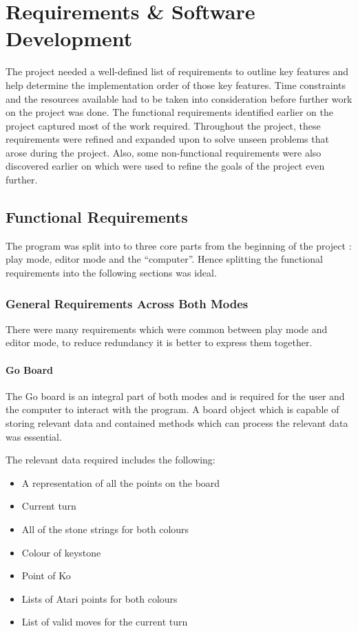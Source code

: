 \documentclass{l4proj}
\begin{document}
\chapter{Requirements \& Software Development}

The project needed a well-defined list of requirements to outline key features and help determine the implementation order of those key features. Time constraints and the resources available had to be taken into consideration before further work on the project was done. The functional requirements identified earlier on the project captured most of the work required. Throughout the project, these requirements were refined and expanded upon to solve unseen problems that arose during the project. Also, some non-functional requirements were also discovered earlier on which were used to refine the goals of the project even further.

\section{Functional Requirements}

The program was split into to three core parts from the beginning of the project : play mode, editor mode and the “computer”. Hence splitting the functional requirements into the following sections was ideal.

\subsection{General Requirements Across Both Modes}
There were many requirements which were common between play mode and editor mode, to reduce redundancy it is better to express them together.

\subsubsection{Go Board}
The Go board is an integral part of both modes and is required for the user and the computer to interact with the program. A board object which is capable of storing relevant data and contained methods which can process the relevant data was essential.

The relevant data required includes the following:
\begin{itemize}
\item A representation of all the points on the board
\item Current turn
\item All of the stone strings for both colours
\item Colour of keystone
\item Point of Ko
\item Lists of Atari points for both colours
\item List of valid moves for the current turn
\end{itemize}
\end{document}
